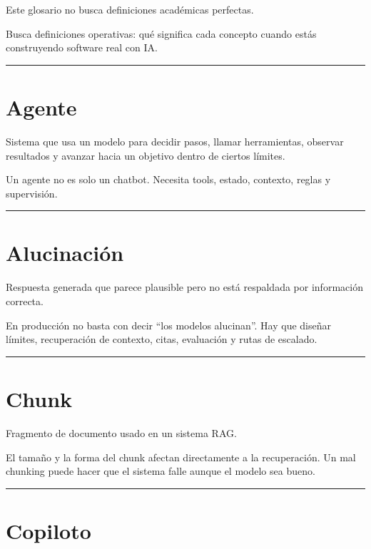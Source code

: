 Este glosario no busca definiciones académicas perfectas.

Busca definiciones operativas: qué significa cada concepto cuando estás
construyendo software real con IA.

\begin{center}\rule{0.5\linewidth}{0.5pt}\end{center}

\section{Agente}\label{agente-9}

Sistema que usa un modelo para decidir pasos, llamar herramientas,
observar resultados y avanzar hacia un objetivo dentro de ciertos
límites.

Un agente no es solo un chatbot. Necesita tools, estado, contexto,
reglas y supervisión.

\begin{center}\rule{0.5\linewidth}{0.5pt}\end{center}

\section{Alucinación}\label{alucinaciuxf3n}

Respuesta generada que parece plausible pero no está respaldada por
información correcta.

En producción no basta con decir ``los modelos alucinan''. Hay que
diseñar límites, recuperación de contexto, citas, evaluación y rutas de
escalado.

\begin{center}\rule{0.5\linewidth}{0.5pt}\end{center}

\section{Chunk}\label{chunk}

Fragmento de documento usado en un sistema RAG.

El tamaño y la forma del chunk afectan directamente a la recuperación.
Un mal chunking puede hacer que el sistema falle aunque el modelo sea
bueno.

\begin{center}\rule{0.5\linewidth}{0.5pt}\end{center}

\section{Copiloto}\label{copiloto-8}


